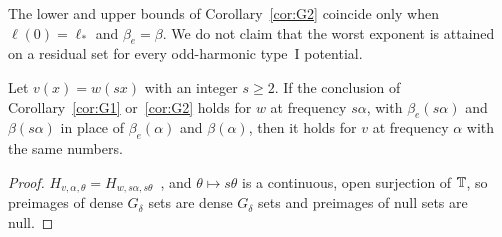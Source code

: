 The lower and upper bounds of Corollary~\ref{cor:G2} coincide only when $\ell(0)=\ell_*$ and $\beta_e=\beta$. We do not claim that the worst exponent is attained on a residual set for every odd-harmonic type~I potential.

\begin{corollary}\label{cor:G3}
Let $v(x)=w(sx)$ with an integer $s\ge2$. If the conclusion of Corollary~\ref{cor:G1} or~\ref{cor:G2} holds for $w$ at frequency $s\alpha$, with $\beta_e(s\alpha)$ and $\beta(s\alpha)$ in place of $\beta_e(\alpha)$ and $\beta(\alpha)$, then it holds for $v$ at frequency $\alpha$ with the same numbers.
\end{corollary}

\begin{proof}
$H_{v,\alpha,\theta}=H_{w,s\alpha,s\theta}$~\cite[Theorem~5.29]{DMuniv}, and $\theta\mapsto s\theta$ is a continuous, open surjection of $\mathbb T$, so preimages of dense $G_\delta$ sets are dense $G_\delta$ sets and preimages of null sets are null.
\end{proof}
